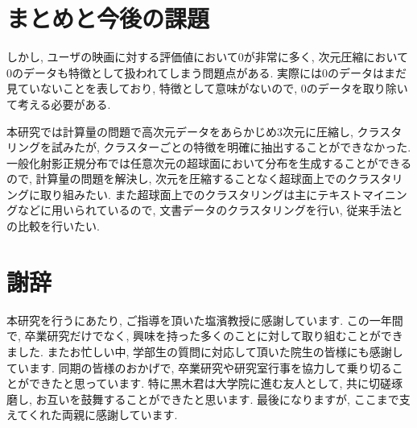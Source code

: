 \documentclass[a4j,12pt]{jarticle}
\begin{document}
\newpage
\section{まとめと今後の課題}

しかし, ユーザの映画に対する評価値において$0$が非常に多く, 次元圧縮において$0$のデータも特徴として扱われてしまう問題点がある. 実際には$0$のデータはまだ見ていないことを表しており, 特徴として意味がないので, $0$のデータを取り除いて考える必要がある.

本研究では計算量の問題で高次元データをあらかじめ$3$次元に圧縮し, クラスタリングを試みたが, クラスターごとの特徴を明確に抽出することができなかった. 一般化射影正規分布では任意次元の超球面において分布を生成することができるので, 計算量の問題を解決し, 次元を圧縮することなく超球面上でのクラスタリングに取り組みたい. また超球面上でのクラスタリングは主にテキストマイニングなどに用いられているので, 文書データのクラスタリングを行い, 従来手法との比較を行いたい. 

\section{謝辞}

本研究を行うにあたり, ご指導を頂いた塩濱教授に感謝しています. この一年間で, 卒業研究だけでなく, 興味を持った多くのことに対して取り組むことができました. またお忙しい中, 学部生の質問に対応して頂いた院生の皆様にも感謝しています. 同期の皆様のおかげで, 卒業研究や研究室行事を協力して乗り切ることができたと思っています. 特に黒木君は大学院に進む友人として, 共に切磋琢磨し, お互いを鼓舞することができたと思います. 最後になりますが, ここまで支えてくれた両親に感謝しています.

\newpage
{} %

%


\end{document}
